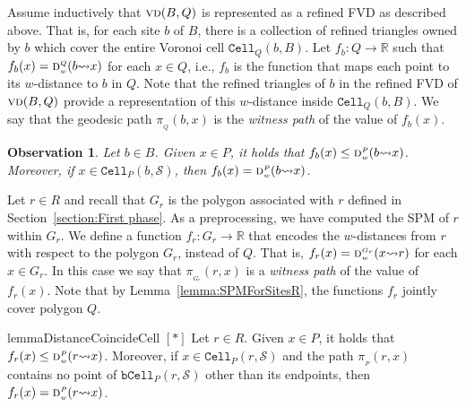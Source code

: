 \documentclass[a4paper,UKenglish]{socg-lipics-v2018}
\newtheorem{observation}[theorem]{Observation}
\newcommand{\s}{\mathcal S}
\newcommand{\dd}[3][P]{\ensuremath{\textsc{d}_{\scriptscriptstyle w}^{\scriptscriptstyle #1}(#2 {\leadsto} #3)}}
\newcommand{\p}[3][P]{\ensuremath{\pi_{_{#1}}(#2, #3)}}
\newcommand{\funnel}[2][P]{\ensuremath{\mathtt{Funnel}_{\scriptscriptstyle #1}(#2)}}
\newcommand{\cell}[2][P]{\ensuremath{\mathtt{Cell}_{\scriptscriptstyle #1}(#2)}}
\newcommand{\bcell}[2][P]{\ensuremath{\mathtt{bCell}_{\scriptscriptstyle #1}(#2)}}
\newcommand{\vd}[2][P]{\textsc{vd}(#2, #1)}
\begin{document}
Assume inductively that $\vd[Q]{B}$ is represented as a refined FVD as described above.
That is, for each site $b$ of $B$, there is a collection of refined triangles owned by $b$ which cover the entire Voronoi cell $\cell[Q]{b, B}$. 
Let $f_b:Q \to \mathbb{R}$ such that $f_b(x) = \dd[Q]{b}{x}$ for each $x\in Q$, i.e., $f_b$ is the function that maps each point to its $w$-distance to $b$ in $Q$. 
Note that the refined triangles of $b$ in the refined FVD of $\vd[Q]{B}$ provide a representation of this $w$-distance inside $\cell[Q]{b, B}$.
We say that the geodesic path $\p[Q]{b}{x}$ is the \emph{witness path} of the value of $f_b(x)$.

\begin{observation}\label{obs: f_s and distance coincide in cell}
Let $b\in B$.
Given $x\in P$, it holds that $f_b(x) \leq \dd{b}{x}$. Moreover, if $x\in \cell{b, \s}$, then $f_b(x) = \dd{b}{x}$. 
\end{observation}

Let $r\in R$ and recall that $G_r$ is the polygon associated with $r$ defined in Section~\ref{section:First phase}. 
As a preprocessing, we have computed the SPM of $r$ within $G_r$.
We define a function $f_r:G_r\to \mathbb{R}$ that encodes the $w$-distances from $r$ with respect to the polygon $G_r$, instead of $Q$. 
That is, $f_r(x) = \dd[G_r]{x}{r}$ for each $x\in G_r$.
In this case we say that $\p[G_r]{r}{x}$ is a \emph{witness path} of the value of $f_r(x)$. 
Note that by Lemma~\ref{lemma:SPMForSitesR}, the functions $f_r$ jointly cover polygon $Q$. 

\begin{restatable}{lemma}{DistanceCoincideCell}\label{lemma: f_r and distance coincide in cell}
$[*]$
Let $r\in R$.
Given $x\in P$, it holds that $f_r(x) \leq \dd{r}{x}$. Moreover, if $x\in \cell{r, \s}$ and the path $\p{r}{x}$ contains no point of $\bcell{r, \s}$ other than its endpoints, then $f_r(x) = \dd{r}{x}$. 
\end{restatable}
\newcommand{\ProofDistanceCoincideCell}{
\DistanceCoincideCell*
\begin{proof}
By Lemma~\ref{lemma:Voronoi cell in funnel}, we know that if $x\in \cell{r,\s}$, then  $x$ belongs to $\funnel{r, \s}$.
Moreover, since $\funnel{r, \s}$ is contained in $G_r$, we know that 
\[ f_r(x) = \dd[G_r]{r}{x} \leq \dd[\funnel{r, \s}]{r}{x} = \dd{r}{x}.\]

If $\p{r}{x}$ contains no point of $\bcell{r, \s}$, then we claim that $\p{r}{x} = \p[G_r]{r}{x}$. 
If this claim is true, then clearly $f_r(x) = \dd[G_r]{r}{x} = \dd{r}{x}$ proving our result.
To prove our claim, notice that path $\p{r}{x}$ is contained in $\funnel{r, \s}$. Moreover, because this path contains no point of $\bcell{r, \s}$ other than its endpoints, then all reflex vertices along it must belong to the walls of $\funnel{r, \s}$. However, all these reflex vertices are also part of $G_r$. Thus, since $\funnel{r, \s}\subseteq G_r$, we conclude that $\p{r}{x} = \p[G_r]{r}{x}$ proving our claim.  
\end{proof}
}
\end{document}
